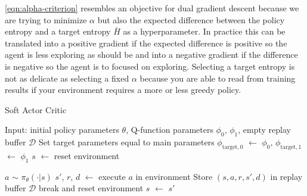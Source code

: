 \eqref{eqn:alpha-criterion} resembles an objective for dual gradient descent because we are trying to minimize $\alpha$ but also the expected difference between the policy entropy and a target entropy $\bar{H}$ as a hyperparameter. In practice this can be translated into a positive gradient if the expected difference is positive so the agent is less exploring as should be and into a negative gradient if the difference is negative so the agent is to focused on exploring. Selecting a target entropy is not as delicate as selecting a fixed $\alpha$ because you are able to read from training results if your environment requires a more or less greedy policy. 

\begin{algorithm}
	\caption{Soft Actor Critic}\label{alg:SAC}
	\begin{algorithmic}
		\State{} Input: initial policy parameters $\theta$, Q-function parameters $\phi_0$, $\phi_1$, empty replay buffer $\mathcal{D}$
			\State{} Set target parameters equal to main parameters $\phi_{\text{target}, 0}$ $\leftarrow$ $\phi_0$, $\phi_{\text{target}, 1}$ $\leftarrow$ $\phi_1$ 
			\State{} $s$ $\leftarrow$ reset environment
			
			\State{} $a$ $\sim$ $\pi_\theta(\cdot | s)$
			\State{} $s'$, $r$, $d$ $\leftarrow$ execute $a$ in environment
			\State{} Store $(s, a, r, s', d)$ in replay buffer $\mathcal{D}$
			\State{} break and reset environment
			\EndIf{}
			\State{} $s$ $\leftarrow$ $s'$
			\EndFor{}
			

\end{algorithmic}
\end{algorithm}
